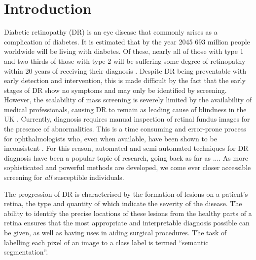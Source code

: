\chapter{Introduction}



Diabetic retinopathy (DR) is an eye disease that commonly arises as a complication of diabetes. It is estimated that by the year 2045 693 million people worldwide will be living with diabetes. Of these, nearly all of those with type 1 and two-thirds of those with type 2 will be suffering some degree of retinopathy within 20 years of receiving their diagnosis \cite{Mathure014444}. Despite DR being preventable with early detection and intervention, this is made difficult by the fact that the early stages of DR show no symptoms and may only be identified by screening. However, the scalability of mass screening is severely limited by the availability of medical professionals, causing DR to remain as leading cause of blindness in the UK \cite{Liewe004015}. Currently, diagnosis requires manual inspection of retinal fundus images for the presence of abnormalities. This is a time consuming and error-prone process for ophthalmologists who, even when available, have been shown to be inconsistent \cite{DBLP:journals/corr/abs-1710-01711}. For this reason, automated and semi-automated techniques for DR diagnosis have been a popular topic of research, going back as far as .... As more sophisticated and powerful methods are developed, we come ever closer accessible screening for \emph{all} susceptible individuals.

The progression of DR is characterised by the formation of lesions on a patient's retina, the type and quantity of which indicate the severity of the disease. The ability to identify the precise locations of these lesions from the healthy parts of a retina ensures that the most appropriate and interpretable diagnosis possible can be given, as well as having uses in aiding surgical procedures. The task of labelling each pixel of an image to a class label is termed ``semantic segmentation''.

